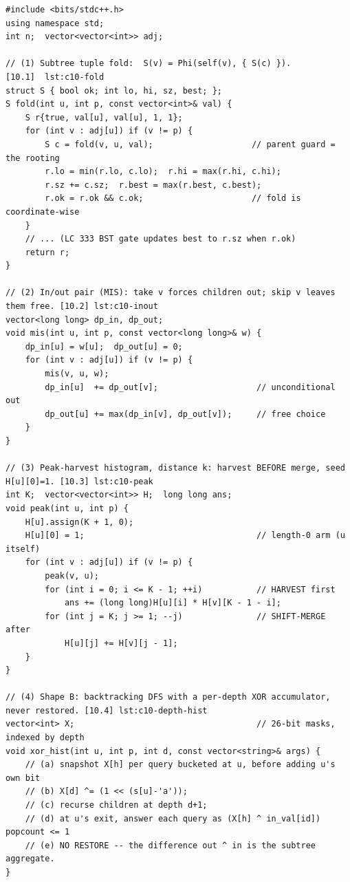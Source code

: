 \begin{lstlisting}[caption={Chapter 13 code kit: the tuple fold, the in/out pair, the peak-harvest merge, the two depth-histogram shapes, and the Summit's per-depth lazy difference}, label={lst:c10-kit}]
#include <bits/stdc++.h>
using namespace std;
int n;  vector<vector<int>> adj;

// (1) Subtree tuple fold:  S(v) = Phi(self(v), { S(c) }).           [10.1]  lst:c10-fold
struct S { bool ok; int lo, hi, sz, best; };
S fold(int u, int p, const vector<int>& val) {
    S r{true, val[u], val[u], 1, 1};
    for (int v : adj[u]) if (v != p) {
        S c = fold(v, u, val);                    // parent guard = the rooting
        r.lo = min(r.lo, c.lo);  r.hi = max(r.hi, c.hi);
        r.sz += c.sz;  r.best = max(r.best, c.best);
        r.ok = r.ok && c.ok;                      // fold is coordinate-wise
    }
    // ... (LC 333 BST gate updates best to r.sz when r.ok)
    return r;
}

// (2) In/out pair (MIS): take v forces children out; skip v leaves them free. [10.2] lst:c10-inout
vector<long long> dp_in, dp_out;
void mis(int u, int p, const vector<long long>& w) {
    dp_in[u] = w[u];  dp_out[u] = 0;
    for (int v : adj[u]) if (v != p) {
        mis(v, u, w);
        dp_in[u]  += dp_out[v];                    // unconditional out
        dp_out[u] += max(dp_in[v], dp_out[v]);     // free choice
    }
}

// (3) Peak-harvest histogram, distance k: harvest BEFORE merge, seed H[u][0]=1. [10.3] lst:c10-peak
int K;  vector<vector<int>> H;  long long ans;
void peak(int u, int p) {
    H[u].assign(K + 1, 0);
    H[u][0] = 1;                                   // length-0 arm (u itself)
    for (int v : adj[u]) if (v != p) {
        peak(v, u);
        for (int i = 0; i <= K - 1; ++i)           // HARVEST first
            ans += (long long)H[u][i] * H[v][K - 1 - i];
        for (int j = K; j >= 1; --j)               // SHIFT-MERGE after
            H[u][j] += H[v][j - 1];
    }
}

// (4) Shape B: backtracking DFS with a per-depth XOR accumulator, never restored. [10.4] lst:c10-depth-hist
vector<int> X;                                     // 26-bit masks, indexed by depth
void xor_hist(int u, int p, int d, const vector<string>& args) {
    // (a) snapshot X[h] per query bucketed at u, before adding u's own bit
    // (b) X[d] ^= (1 << (s[u]-'a'));
    // (c) recurse children at depth d+1;
    // (d) at u's exit, answer each query as (X[h] ^ in_val[id]) popcount <= 1
    // (e) NO RESTORE -- the difference out ^ in is the subtree aggregate.
}


\end{lstlisting}
